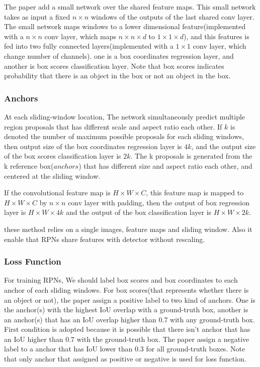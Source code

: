 \documentclass[extendedabs]{bmvc2k}
\begin{document}
The paper\cite{fasterrcnn} add a small network over the shared feature maps. This small network takes as input a fixed $n\times n$ windows of the outputs of the last shared conv layer. The small network maps windows to a lower dimensional feature(implemented with a $n\times n$ conv layer, which maps $n\times n\times d$ to $1 \times 1 \times d$), and this features is fed into two fully connected layers(implemented with a $1\times1$ conv layer, which change number of channels). one is a box coordinates regression layer, and another is box scores classification layer. Note that box scores indicates probability that there is an object in the box or not an object in the box.
\subsubsection{Anchors}
At each sliding-window location, The network simultaneously predict multiple region proposals that has different scale and aspect ratio each other. If $k$ is denoted the number of maximum possible proposals for each sliding windows, then output size of the box coordinates regression layer is $4k$, and the output size of the box scores classification layer is $2k$. The k proposals is generated from the k reference box($anchors$) that has different size and aspect ratio each other, and centered at the sliding window.

If the convolutional feature map is $H\times W\times C$, this feature map is mapped to $H\times W\times C$ by $n\times n$ conv layer with padding, then the output of box regression layer is $H\times W\times 4k$ and the output of the box classification layer is $H\times W\times 2k$.

these method relies on a single images, feature maps and sliding window. Also it enable that RPNs share features with detector without rescaling.

\subsubsection{Loss Function}
For training RPNs, We should label box scores and box coordinates to each anchor of each sliding windows. For box scores(that represents whether there is an object or not), the paper\cite{fasterrcnn} assign a positive label to two kind of anchors. One is the anchor(s) with the highest IoU overlap with a ground-truth box, another is an anchor(s) that has an IoU overlap higher than 0.7 with any ground-truth box. First condition is adopted because it is possible that there isn't anchor that has an IoU higher than 0.7 with the ground-truth box. The paper\cite{fasterrcnn} assign a negative label to a anchor that has IoU lower than 0.3 for all ground-truth boxes. Note that only anchor that assigned as positive or negative is used for loss function.
\end{document}
